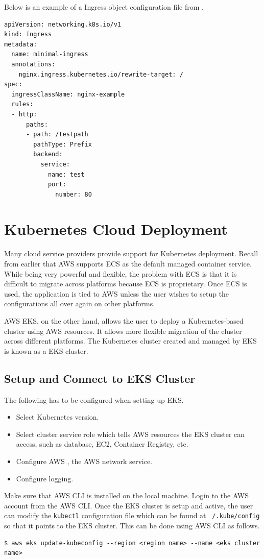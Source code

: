 Below is an example of a Ingress object configuration file from \cite{kubernetes2024doc}.
\begin{lstlisting}
apiVersion: networking.k8s.io/v1
kind: Ingress
metadata:
  name: minimal-ingress
  annotations:
    nginx.ingress.kubernetes.io/rewrite-target: /
spec:
  ingressClassName: nginx-example
  rules:
  - http:
      paths:
      - path: /testpath
        pathType: Prefix
        backend:
          service:
            name: test
            port:
              number: 80
\end{lstlisting}

\section{Kubernetes Cloud Deployment}

Many cloud service providers provide support for Kubernetes deployment. Recall from earlier that AWS supports ECS as the default managed container service. While being very powerful and flexible, the problem with ECS is that it is difficult to migrate across platforms because ECS is proprietary. Once ECS is used, the application is tied to AWS unless the user wishes to setup the configurations all over again on other platforms.

AWS EKS, on the other hand, allows the user to deploy a Kubernetes-based cluster using AWS resources. It allows more flexible migration of the cluster across different platforms. The Kubernetes cluster created and managed by EKS is known as a EKS cluster.

\subsection{Setup and Connect to EKS Cluster}

The following has to be configured when setting up EKS.

\begin{itemize}
  \item Select Kubernetes version.
  \item Select cluster service role which tells AWS resources the EKS cluster can access, such as database, EC2, Container Registry, etc. 
  \item Configure AWS , the AWS network service.
  \item Configure logging.
\end{itemize}

Make sure that AWS CLI is installed on the local machine. Login to the AWS account from the AWS CLI. Once the EKS cluster is setup and active, the user can modify the \verb|kubectl| configuration file which can be found at \texttt{~/.kube/config} so that it points to the EKS cluster. This can be done using AWS CLI as follows.
\begin{lstlisting}
$ aws eks update-kubeconfig --region <region name> --name <eks cluster name>
\end{lstlisting}

